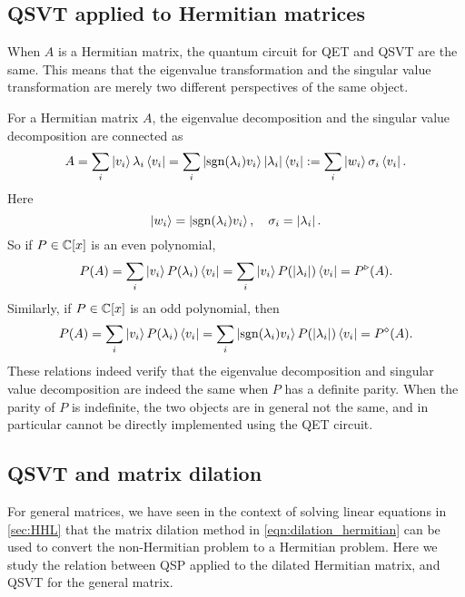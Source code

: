 \subsection{QSVT applied to Hermitian matrices}

When $A$ is a Hermitian matrix, the quantum circuit for QET and QSVT are the same.
This means that the eigenvalue transformation and the singular value transformation are merely two different perspectives of the same object.

For a Hermitian matrix $A$, the eigenvalue decomposition and the singular value decomposition are connected as
\begin{equation}
A=\sum_{i} \ket{v_i}\lambda_i \bra{v_i}=\sum_{i} \ket{\operatorname{sgn}(\lambda_i)v_i} \left\lvert\lambda_i\right\rvert \bra{v_i}:=\sum_{i} \ket{w_i} \sigma_i \bra{v_i}.
\end{equation}
Here 
\begin{equation}
\ket{w_i}=\ket{\operatorname{sgn}(\lambda_i)v_i}, \quad \sigma_i=\left\lvert\lambda_i\right\rvert.
\end{equation}
So if $P\in\mathbb{C}[x]$ is an even polynomial,
\begin{equation}
P(A)=\sum_{i} \ket{v_i}P(\lambda_i)\bra{v_i}=\sum_{i} \ket{v_i}P(\left\lvert\lambda_i\right\rvert)\bra{v_i}=P^{\triangleright}(A).
\end{equation}
Similarly, if $P\in\mathbb{C}[x]$ is an odd polynomial, then
\begin{equation}
P(A)=\sum_{i} \ket{v_i}P(\lambda_i)\bra{v_i}=\sum_{i} \ket{\operatorname{sgn}(\lambda_i)v_i}P(\left\lvert\lambda_i\right\rvert)\bra{v_i}=P^{\diamond}(A).
\end{equation}
These relations indeed verify that the eigenvalue decomposition and singular value decomposition are indeed the same when $P$ has a definite parity.
When the parity of $P$ is indefinite, the two objects are in general not the same, and in particular cannot be directly implemented using the QET circuit. 

\subsection{QSVT and matrix dilation}

For general matrices, we have seen in the context of solving linear equations in \cref{sec:HHL} that the matrix dilation method in \cref{eqn:dilation_hermitian} can be used to convert the non-Hermitian problem to a Hermitian problem.
Here we study the relation between QSP applied to the dilated Hermitian matrix, and QSVT for the general matrix.


